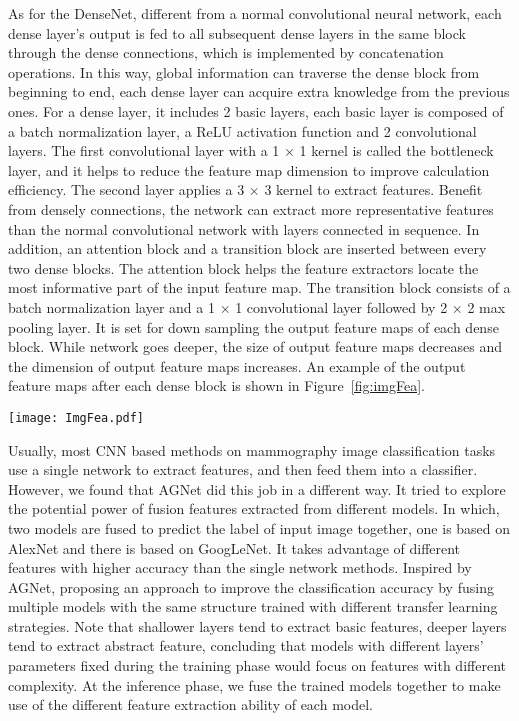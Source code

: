 As for the DenseNet, different from a normal 
convolutional neural network, each dense 
layer’s output is fed to all subsequent dense 
layers in the same block through the dense 
connections, which is implemented by 
concatenation operations. In this way, global 
information can traverse the dense block from 
beginning to end, each dense layer can 
acquire extra knowledge from the previous ones. 
For a dense layer, it includes 2 basic layers, 
each basic layer is composed of a batch 
normalization layer, a ReLU activation 
function
\cite{Srivastava2014,Ioffe2015,Kingma2015} 
and 2 convolutional layers. The first 
convolutional layer with a 1 × 1 kernel is 
called the bottleneck layer, and it helps to 
reduce the feature map dimension to improve 
calculation efficiency. The second layer 
applies a 3 × 3 kernel to extract features. 
Benefit from densely connections, the network 
can extract more representative features than 
the normal convolutional network with layers 
connected in sequence. In addition, an 
attention block and a transition block are 
inserted between every two dense blocks. The 
attention block helps the feature extractors 
locate the most informative part of the 
input feature map. The transition block 
consists of a batch normalization layer 
and a 1 × 1 convolutional layer followed 
by 2 × 2 max pooling layer. It is set for 
down sampling the output feature maps of 
each dense block. While network goes deeper, 
the size of output feature maps decreases 
and the dimension of output feature maps 
increases. An example of the output feature 
maps after each dense block is shown in 
Figure~\ref{fig:imgFea}.

\begin{figure*}[!ht]
    \centering
    \texttt{[image: ImgFea.pdf]}
    \caption{The feature of the 
        fusion of extractors' result.}
    \label{fig:imgFea}
\end{figure*} 

Usually, most CNN based methods on mammography 
image classification tasks use a single network 
to extract features, and then feed them into 
a classifier. However, we found that AGNet
did this job in a different way. It tried to 
explore the potential power of fusion features 
extracted from different models. In which, two 
models are fused to predict the label of input 
image together, one is based on AlexNet and  
there is based on GoogLeNet. It takes 
advantage of different features with higher 
accuracy than the single network methods.
Inspired by AGNet, proposing an approach to 
improve the classification accuracy by 
fusing multiple models with the same structure 
trained with different transfer learning 
strategies. Note that shallower layers tend to 
extract basic features, deeper layers tend to 
extract abstract feature, concluding that 
models with different layers’ parameters 
fixed during the training phase would focus on 
features with different complexity.
\cite{Ciresan2012}
At the inference phase, we fuse the trained models 
together to make use of the different 
feature extraction ability of each model.

